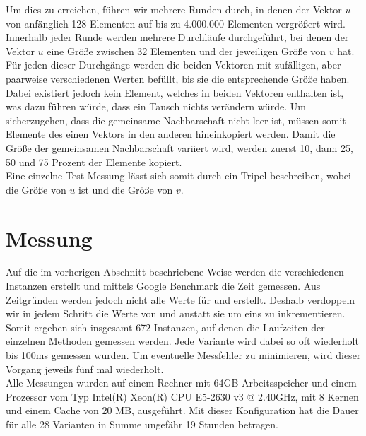 Um dies zu erreichen, führen wir mehrere Runden durch, in denen der Vektor $u$ von anfänglich 128
Elementen auf bis zu 4.000.000 Elementen vergrößert wird. Innerhalb jeder Runde werden mehrere Durchläufe 
durchgeführt, bei denen der Vektor $u$ eine Größe zwischen 32 Elementen und der jeweiligen Größe von $v$ hat.
Für jeden dieser Durchgänge werden die beiden Vektoren mit zufälligen, aber paarweise verschiedenen
Werten befüllt, bis sie die entsprechende Größe haben. 
Dabei existiert jedoch kein Element, welches in beiden Vektoren 
enthalten ist, was dazu führen würde, dass ein \gc{} 
Tausch nichts verändern würde. Um sicherzugehen,
dass die gemeinsame Nachbarschaft nicht leer ist, müssen somit Elemente des einen Vektors 
in den anderen hineinkopiert werden. Damit die Größe der gemeinsamen Nachbarschaft
variiert wird, werden zuerst 10, dann 25, 50 und 75 Prozent der Elemente kopiert. 
\\

Eine einzelne Test-Messung lässt sich somit durch ein Tripel \fett{(\la, \sm, \fr)} beschreiben, wobei
\fett{\la} die Größe von $u$ ist und \fett{\sm} die 
Größe von $v$.






\section{Messung}
Auf die im vorherigen Abschnitt beschriebene Weise werden die verschiedenen Instanzen erstellt und
mittels Google Benchmark die Zeit gemessen. Aus Zeitgründen werden jedoch nicht alle Werte 
für \la{} und \sm{} erstellt. Deshalb verdoppeln wir in jedem Schritt die Werte von \la{} und \sm{,}
anstatt sie um eins zu inkrementieren. Somit ergeben sich insgesamt 672 Instanzen, auf denen die Laufzeiten der 
einzelnen Methoden gemessen werden. Jede Variante wird dabei so oft wiederholt bis 100ms gemessen wurden.
Um eventuelle Messfehler zu minimieren, wird
dieser Vorgang 
jeweils fünf mal wiederholt. 
\\

Alle Messungen wurden auf einem Rechner mit 64GB Arbeitsspeicher und einem Prozessor vom Typ Intel(R) Xeon(R) CPU E5-2630 v3 @ 2.40GHz,
mit 8 Kernen und einem Cache von 20 MB, ausgeführt.
Mit dieser Konfiguration hat die Dauer für alle 28 Varianten in Summe ungefähr 19 Stunden betragen.





